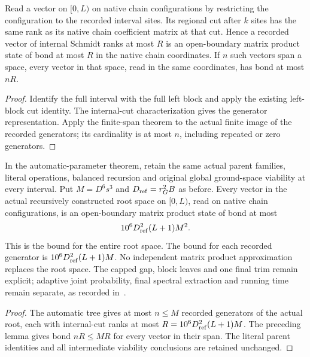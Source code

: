 \begin{lemma}
    \label{lem:full_interval_mps_span}
    \leanok
    Read a vector on $[0,L)$ on native chain configurations by restricting
    the configuration to the recorded interval sites. Its regional cut
    after $k$ sites has the same rank as its native chain coefficient
    matrix at that cut. Hence a recorded vector of internal Schmidt ranks
    at most $R$ is an open-boundary matrix product state of bond at most
    $R$ in the native chain coordinates. If $n$ such vectors span a space,
    every vector in that space, read in the same coordinates, has bond
    at most $nR$.
\end{lemma}
\begin{proof}\leanok
    Identify the full interval with the full left block and apply the
    existing left-block cut identity. The internal-cut characterization
    gives the generator representation. Apply the finite-span theorem to
    the actual finite image of the recorded generators; its cardinality
    is at most $n$, including repeated or zero generators.
\end{proof}

\begin{lemma}
    \label{thm:physical_dg_interval_tree_mps}
    \leanok
    In the automatic-parameter theorem, retain the same actual parent
    families, literal operations, balanced recursion and original global
    ground-space viability at every interval. Put $M=D^6s^3$ and
    $D_{\rm ref}=r_G^2B$ as before. Every vector in the actual recursively
    constructed root space on $[0,L)$, read on native chain configurations,
    is an open-boundary matrix product state of bond at most
    \[
        10^6D_{\rm ref}^2(L+1)M^2.
    \]
    This is the bound for the entire root space. The bound for each
    recorded generator is $10^6D_{\rm ref}^2(L+1)M$.
    No independent matrix product approximation replaces the root space.
    The capped gap, block leaves and one final trim remain explicit;
    adaptive joint probability, final spectral extraction and running
    time remain separate, as recorded
    in~\cite{gap:alvv16_approximation_parameters}.
\end{lemma}
\begin{proof}\leanok
    The automatic tree gives at most $n\le M$ recorded generators of the
    actual root, each with internal-cut ranks at most
    $R=10^6D_{\rm ref}^2(L+1)M$. The preceding lemma gives bond $nR\le MR$
    for every vector in their span. The literal parent identities and all
    intermediate viability conclusions are retained unchanged.
\end{proof}


